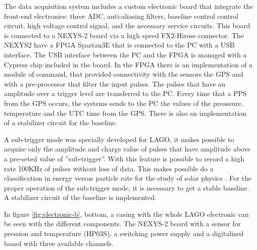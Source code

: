 The data acquisition system includes a custom electronic board that integrate
the front-end electronics: three ADC, anti-aliasing filters, baseline control
control circuit, high voltage control signal, and the necessary service
circuits. This board is connected to a NEXYS-2 board \cite{nexys2} via a high
speed FX2-Hirose connector. The NEXYS2 have a FPGA Spartan3E that is connected
to the PC with a USB interface. The USB interface between the PC and the FPGA
is managed with a Cypress chip included in the board. In the FPGA there is an
implementation of a module of command, that provided connectivity with the
sensors the GPS and with a pre-processor that filter the input pulses. The
pulses that have an amplitude over a trigger level are transferred to the PC.
Every time that a PPS from the GPS occurs, the systems sends to the PC the
values of the preassure, temperature and the UTC time from the GPS. There is
also an implementation of a stabilizer circuit for the baseline.

A sub-trigger mode was specially developed for LAGO, it makes possible to
acquire only the amplitude and charge value of pulses that have amplitude above
a pre-seted value of ''sub-trigger''. With this feature is possible to  record
a high rate 100KHz of pulses without loss of data. This makes possible do a
classification in energy versus particle rate for the study of  solar physics
\cite{asorey:13}. For the proper operation of the sub-trigger mode, it is
necessary to get a stable baseline. A stabilizer circuit of the baseline is
implemented.

In figure \ref{fig:electronic-b}, bottom, a casing with the whole LAGO
electronic can be seen with the different components. The NEXYS-2 board with a
sensor for pression and temperature (HP03S), a switching power supply and a
digitalized board with three available channels.

